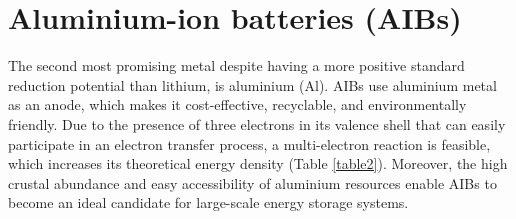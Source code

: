\section{Aluminium-ion batteries (AIBs)}
The second most promising metal despite having a more positive standard reduction potential than lithium, is aluminium (Al). AIBs use aluminium metal as an anode, which makes it cost-effective, recyclable, and environmentally friendly. Due to the presence of three electrons in its valence shell that can easily participate in an electron transfer process, a multi-electron reaction is feasible, which increases its theoretical energy density (Table \ref{table2}). Moreover, the high crustal abundance and easy accessibility of aluminium resources enable AIBs to become an ideal candidate for large-scale energy storage systems. \\
